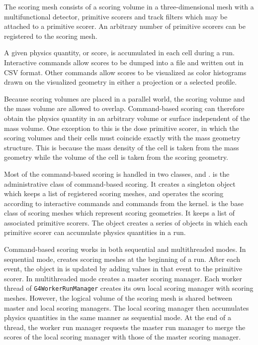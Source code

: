 The scoring mesh consists of a scoring volume in a three-dimensional mesh with
a multifunctional detector, primitive scorers and track filters which may be 
attached to a primitive scorer.  An arbitrary number of primitive scorers can 
be registered to the scoring mesh.

A given physics quantity, or score, is accumulated in each cell during a run. 
Interactive commands allow scores to be dumped into a file and written out in 
CSV format.  Other commands allow scores to be visualized as color histograms
drawn on the visualized geometry in either a projection or a selected profile.
 
Because scoring volumes are placed in a parallel world, the scoring volume and
the mass volume are allowed to overlap.  Command-based scoring can therefore 
obtain the physics quantity in an arbitrary volume or surface independent of the
mass volume.  One exception to this is the dose primitive scorer, in which 
the scoring volumes and their cells must coincide exactly with the mass geometry
structure.  This is because the mass density of the cell is taken from the mass 
geometry while the volume of the cell is taken from the scoring geometry. 

%
%
Most of the command-based scoring is handled in two classes,
 and .
 is the administrative class of command-based scoring.
It creates a singleton object which keeps a list of registered scoring meshes,
and operates the scoring according to interactive commands and commands from 
the \Gfour{} kernel.  is the base class of 
scoring meshes which represent scoring geometries.  It keeps a list of 
associated primitive scorers.  The  object
creates a series of  objects in which each primitive scorer
can accumulate physics quantities in a run. 

Command-based scoring works in both sequential and multithreaded modes.  In
sequential mode,  creates scoring meshes at the beginning
of a run.  After each event, the  object in
 is updated by adding values in that event
to the primitive scorer.  In multithreaded mode  creates
a master scoring manager.  Each worker thread of \texttt{G4WorkerRunManager} 
creates its own local scoring manager with scoring meshes.  However, the logical
volume of the scoring mesh is shared between master and local scoring managers.
The local scoring manager then accumulates physics quantities in the same manner
as sequential mode.  At the end of a thread, the worker run manager requests the
master run manager to merge the scores of the local scoring manager with those
of the master scoring manager. 


